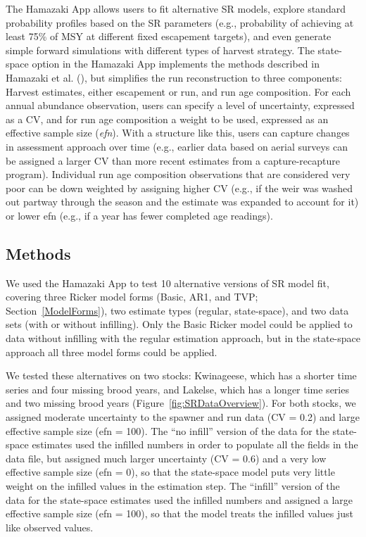 \documentclass[french,11pt]{book}
\begin{document}
The Hamazaki App allows users to fit alternative SR models, explore standard probability profiles based on the SR parameters (e.g., probability of achieving at least 75\% of MSY at different fixed escapement targets), and even generate simple forward simulations with different types of harvest strategy. The state-space option in the Hamazaki App implements the methods described in Hamazaki et al. (), but simplifies the run reconstruction to three components: Harvest estimates, either escapement or run, and run age composition. For each annual abundance observation, users can specify a level of uncertainty, expressed as a CV, and for run age composition a weight to be used, expressed as an effective sample size (\emph{efn}). With a structure like this, users can capture changes in assessment approach over time (e.g., earlier data based on aerial surveys can be assigned a larger CV than more recent estimates from a capture-recapture program). Individual run age composition observations that are considered very poor can be down weighted by assigning higher CV (e.g., if the weir was washed out partway through the season and the estimate was expanded to account for it) or lower efn (e.g., if a year has fewer completed age readings).

\subsection{Methods}\label{methods-2}

We used the Hamazaki App to test 10 alternative versions of SR model fit, covering three Ricker model forms (Basic, AR1, and TVP; Section~\ref{ModelForms}), two estimate types (regular, state-space), and two data sets (with or without infilling). Only the Basic Ricker model could be applied to data without infilling with the regular estimation approach, but in the state-space approach all three model forms could be applied.

We tested these alternatives on two stocks: Kwinageese, which has a shorter time series and four missing brood years, and Lakelse, which has a longer time series and two missing brood years (Figure~\ref{fig:SRDataOverview}). For both stocks, we assigned moderate uncertainty to the spawner and run data (CV = 0.2) and large effective sample size (efn = 100). The ``no infill'' version of the data for the state-space estimates used the infilled numbers in order to populate all the fields in the data file, but assigned much larger uncertainty (CV = 0.6) and a very low effective sample size (efn = 0), so that the state-space model puts very little weight on the infilled values in the estimation step. The ``infill'' version of the data for the state-space estimates used the infilled numbers and assigned a large effective sample size (efn = 100), so that the model treats the infilled values just like observed values.
\end{document}
